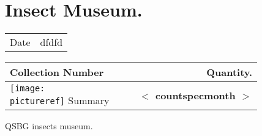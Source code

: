 \documentclass{article}
\newcommand{\placeholder}[1]{\textbf{$<$ #1 $>$}}
\newcommand{\countspecmonth}{\placeholder{countspecmonth}}
\newcommand{\pictureref}{\placeholder{durable_no_main}}
\begin{document}
\section*{Insect Museum.}


	\begin{tabular}{l l}
		Date	& dfdfd \\
	\end{tabular}

	\vspace{15mm}
	\begin{tabularx}{\textwidth}{X r r | r}

	\textbf{Collection Number} &  &  & \textbf{Quantity.}\\

	\hline
	

   


    
    \texttt{[image: \\pictureref]} 
	\hline
	Summary & & & \countspecmonth{} \\
	\end{tabularx}
	
	\vfill
	QSBG insects museum.
\end{document}
